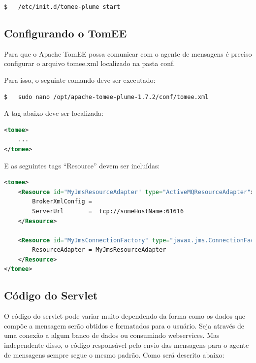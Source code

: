 \begin{lstlisting}[language=bash]
$   /etc/init.d/tomee-plume start
\end{lstlisting}

\subsection{Configurando o TomEE}
\label{sec:configurando-tomee}

Para que o Apache TomEE possa comunicar com o agente de mensagens é preciso configurar o arquivo tomee.xml localizado na pasta conf.

Para isso, o seguinte comando deve ser executado: \\

\begin{lstlisting}[language=bash]
$   sudo nano /opt/apache-tomee-plume-1.7.2/conf/tomee.xml
\end{lstlisting}

A tag abaixo deve ser localizada: \\

\begin{lstlisting}[language=xml]
<tomee>
	...
</tomee>
\end{lstlisting}

E as seguintes tags ``Resource'' devem ser incluídas: \\

\begin{lstlisting}[language=xml]
<tomee>
	<Resource id="MyJmsResourceAdapter" type="ActiveMQResourceAdapter">
		BrokerXmlConfig =
		ServerUrl       =  tcp://someHostName:61616
	</Resource>

	<Resource id="MyJmsConnectionFactory" type="javax.jms.ConnectionFactory">
		ResourceAdapter = MyJmsResourceAdapter
	</Resource>
</tomee>
\end{lstlisting}

\subsection{Código do Servlet}
\label{sec:codigo-servlet}

O código do servlet pode variar muito dependendo da forma como os dados que compõe a mensagem serão obtidos e formatados para o usuário. Seja através de uma conexão a algum banco de dados ou consumindo webservices. Mas independente disso, o código responsável pelo envio das mensagens para o agente de mensagens sempre segue o mesmo padrão. Como será descrito abaixo:

